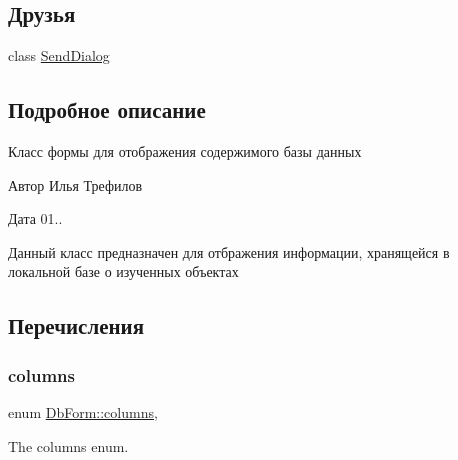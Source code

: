 \subsection*{Друзья}
\begin{DoxyCompactItemize}
\item 
class \hyperlink{classDbForm_a6f843022f5255cb942da23ecb29ae451}{Send\+Dialog}
\end{DoxyCompactItemize}


\subsection{Подробное описание}
Класс формы для отображения содержимого базы данных 

\begin{DoxyAuthor}{Автор}
Илья Трефилов 
\end{DoxyAuthor}
\begin{DoxyDate}{Дата}
01..
\end{DoxyDate}
Данный класс предназначен для отбражения информации, хранящейся в локальной базе о изученных объектах 

\subsection{Перечисления}
\mbox{\label{classDbForm_a86764414aea9eeb51e9cdfa722447b93}} 
\subsubsection{\texorpdfstring{columns}{columns}}
{\footnotesize\ttfamily enum \hyperlink{classDbForm_a86764414aea9eeb51e9cdfa722447b93}{Db\+Form\+::columns}\hspace{0.3cm}{\ttfamily [strong]}, {\ttfamily [private]}}



The columns enum. 

